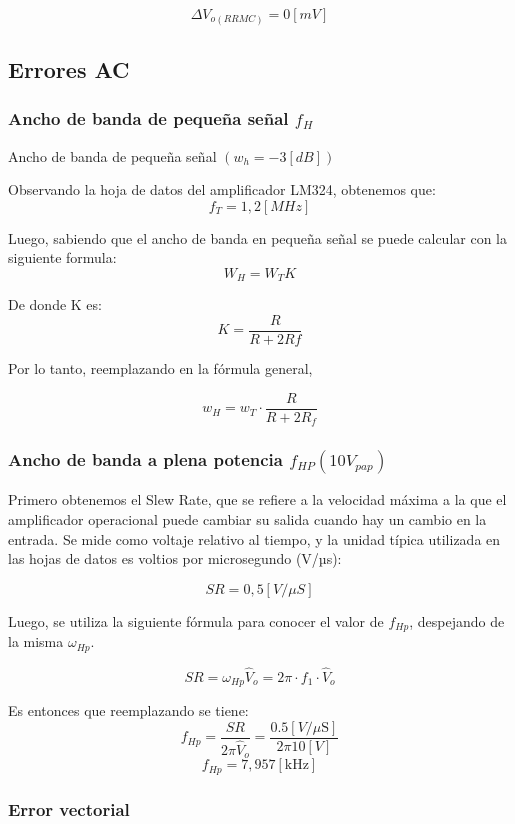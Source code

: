 \[ \Delta V_{o (RRMC) }=0 [ mV ]\]


\subsection{Errores AC}

\subsubsection{Ancho de banda de pequeña señal $f_H$}



Ancho de banda de pequeña señal $\left(w_{h}=-3[d B]\right)$

Observando la hoja de datos del amplificador LM324, obtenemos que:
\[f_T = 1,2 [MHz]\]
 

Luego, sabiendo que el ancho de banda en pequeña señal se puede calcular con la siguiente formula: 
\[ W_H = W_{T} K \]

De donde K es:
\[ K=\frac{R}{R+2 R f}\]

Por lo tanto, reemplazando en la fórmula general,

\[ w_H = w_{T} \cdot \frac{R}{R+2 R_f} \]


\subsubsection{Ancho de banda a plena potencia \(f_{HP} (10 V_{pap})\) } 


Primero obtenemos el Slew Rate, que se refiere a la velocidad máxima a la que el amplificador operacional puede cambiar su salida cuando hay un cambio en la entrada. Se mide como voltaje relativo al tiempo, y la unidad típica utilizada en las hojas de datos es voltios por microsegundo (V/µs):


 \[ S R=0,5[V / \mu S] \] 

Luego, se utiliza la siguiente fórmula para conocer el valor de $f_{Hp}$, despejando de la misma $\omega_{Hp}$.

\[ S R = \omega_{Hp} \hat{V}_{o} = 2 \pi \cdot  f_{1} \cdot  \hat{V}_{o} \]

Es entonces que reemplazando se tiene:
\[ f_{Hp} = \frac{S R}{2 \pi \hat{V}_{o}} = \frac{0.5[V/ \mu \mathrm{S}]}{2 \pi 10[V]} \]
\[ f_{Hp} = 7,957 [\mathrm{kHz}] \]

\subsubsection{Error vectorial }

